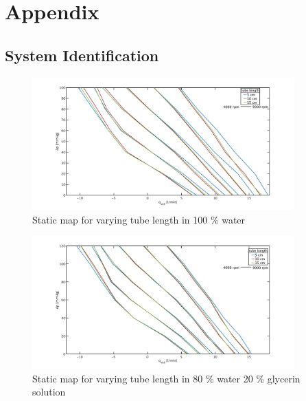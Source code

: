 \chapter{Appendix}
\section{System Identification}\label{A1}
\begin{figure}[ht]
  \includegraphics[width=0.9\textwidth]{images/plots_syst_ident/100w_tube_length_new.pdf}
  \caption[Static map for different tube length in 100 \% water]{Static map for varying tube length in 100 \% water}
  \label{fig:anh_1}
\end{figure}

\begin{figure}[ht]
  \includegraphics[width=0.9\textwidth]{images/plots_syst_ident/80w20g_tube_length_new.pdf}
  \caption[Static map for different tube length in 80 \% water 20 \% glycerin solution]{Static map for varying tube length in 80 \% water 20 \% glycerin solution}
 \label{fig:anh_2}
\end{figure}

